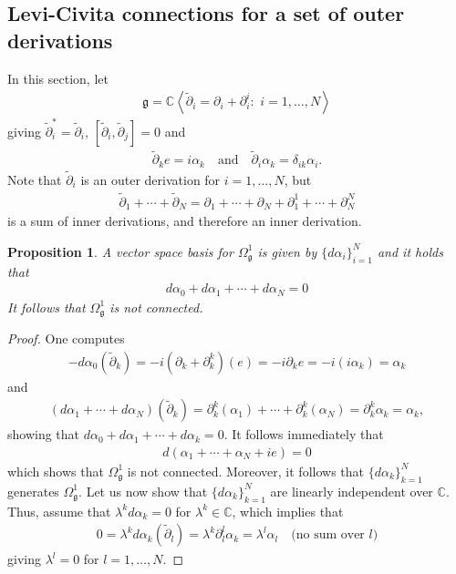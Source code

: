 \documentclass{amsart}
\newcommand{\complex}{\mathbb{C}}
\newcommand{\angles}[1]{\left\langle #1 \right\rangle}
\newtheorem{proposition}[theorem]{Proposition}
\theoremstyle{definition}
\theoremstyle{remark}
\numberwithin{equation}{section}
\renewcommand{\d}{\partial}
\newcommand{\dt}{\tilde{\d}}
\newcommand{\qand}{\quad\text{and}\quad}
\newcommand{\g}{\mathfrak{g}}
\newcommand{\Omegaoneg}{\Omega^1_{\g}}
\begin{document}
\subsection{Levi-Civita connections for a set of outer derivations}

In this section, let
\begin{align*}
  \g = \complex\angles{\dt_i=\d_i+\d_i^i:\,\, i=1,\ldots,N}
\end{align*}
giving $\dt_i^\ast=\dt_i$, $[\dt_i,\dt_j]=0$ and
\begin{align*}
  \dt_ke = i\alpha_k\qand\dt_i\alpha_k = \delta_{ik}\alpha_i.
\end{align*}
Note that $\dt_i$ is an outer derivation for $i=1,\ldots,N$, but
\begin{align*}
  \dt_1+\cdots+\dt_N = \d_1+\cdots+\d_N+\d_1^1+\cdots+\d_N^N
\end{align*}
is a sum of inner derivations, and therefore an inner derivation.

\begin{proposition}
  A vector space basis for $\Omegaoneg$ is given by
  $\{d\alpha_i\}_{i=1}^N$ and it holds that
  \begin{align*}
    d\alpha_0 + d\alpha_1+\cdots+d\alpha_N=0
  \end{align*}
  It follows that $\Omegaoneg$ is not connected.
\end{proposition}

\begin{proof}
  One computes
  \begin{align*}
    -d\alpha_0(\dt_k) = -i(\d_k+\d^k_k)(e) = -i\d_ke = -i(i\alpha_k)=\alpha_k
  \end{align*}
  and
  \begin{align*}
    (d\alpha_1+\cdots+d\alpha_N)(\dt_k)
    = \d_k^k(\alpha_1)+\cdots+\d_k^k(\alpha_N)
    = \d_k^k\alpha_k = \alpha_k, 
  \end{align*}
  showing that $d\alpha_0+d\alpha_1+\cdots+d\alpha_k = 0$. It follows
  immediately that
  \begin{align*}
    d(\alpha_1+\cdots+\alpha_N+ie) = 0 
  \end{align*}
  which shows that $\Omegaoneg$ is not connected. Moreover, it follows
  that $\{d\alpha_k\}_{k=1}^N$ generates $\Omegaoneg$. Let us now show
  that $\{d\alpha_k\}_{k=1}^N$ are linearly independent over
  $\complex$. Thus, assume that $\lambda^kd\alpha_k=0$ for $\lambda^k\in\complex$, which implies
  that
  \begin{align*}
    0=\lambda^kd\alpha_k(\dt_l) = \lambda^k\d_l^l\alpha_k
    =\lambda^l\alpha_l\quad\text{(no sum over $l$)} 
  \end{align*}
  giving $\lambda^l=0$ for $l=1,\ldots,N$.
\end{proof}
\end{document}
